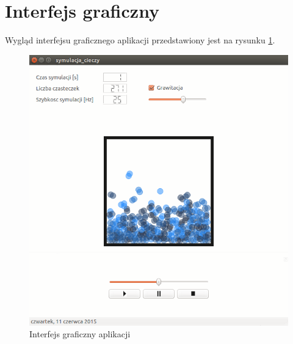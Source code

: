 
\section{Interfejs graficzny}
Wygląd interfejsu graficznego aplikacji przedstawiony jest na rysunku \ref{fig:gui}.

\begin{figure}
 \begin{center}
  \includegraphics[width=\textwidth]{./rysunki/gui}
 \end{center}
 \caption{Interfejs graficzny aplikacji}
 \label{fig:gui}
\end{figure}
